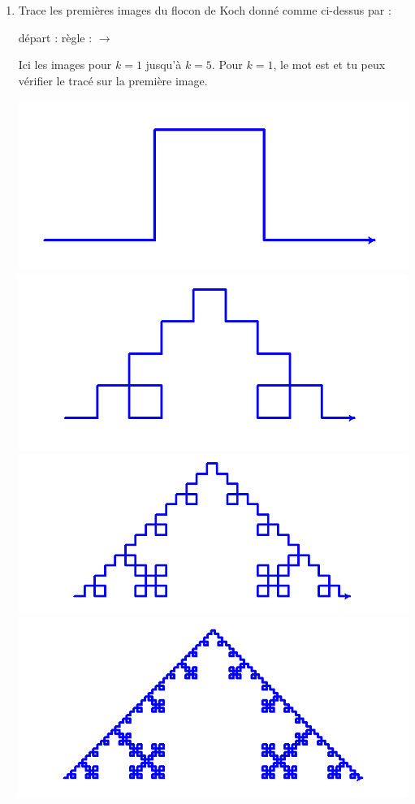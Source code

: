 \documentclass[11pt,class=report,crop=false]{standalone}
\begin{document}
\begin{activite}
\begin{enumerate}
\begin{itemize}
  \end{itemize}
  
  \item Trace les premières images du  flocon de Koch donné comme ci-dessus par : \\
  \centerline{départ :  \qquad règle :  $\rightarrow$ } 
  
  
  Ici les images pour $k=1$ jusqu'à $k=5$.
  Pour $k=1$, le mot est  et tu peux vérifier le tracé sur la première image.
  
\begin{center}
\includegraphics[scale=0.22]{ecran-lsysteme-3a}
\includegraphics[scale=0.22]{ecran-lsysteme-3b}
\includegraphics[scale=0.22]{ecran-lsysteme-3c}
\includegraphics[scale=0.22]{ecran-lsysteme-3d}

\end{center}
\end{enumerate}
\end{activite}
\end{document}
